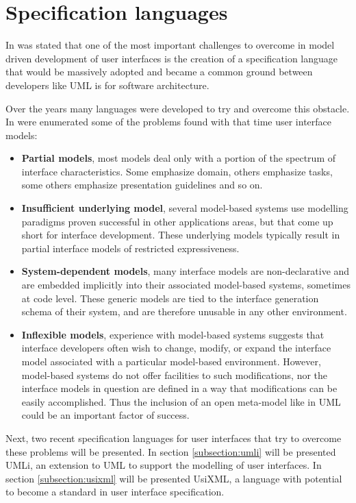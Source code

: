 \section{Specification languages}
\label{section:specification_languages}

In \cite{idealxml2} was stated that one of the most important challenges to overcome in model driven development of user interfaces is the creation of a specification language that would be massively adopted and became a common ground between developers like UML is for software architecture.

Over the years many languages were developed to try and overcome this obstacle. In \cite{mecano} were enumerated some of the problems found with that time user interface models:
\begin{itemize}
\item \textbf{Partial models}, most models deal only with a portion of the spectrum of interface characteristics. Some emphasize domain, others emphasize tasks, some others emphasize presentation guidelines and so on.

\item \textbf{Insufficient underlying model}, several model-based systems use modelling paradigms proven successful in other applications areas, but that come up short for interface development. These underlying models typically result in partial interface models of restricted expressiveness.

\item \textbf{System-dependent models}, many interface models are non-declarative and are embedded implicitly into their associated model-based systems, sometimes at code level. These generic models are tied to the interface generation schema of their system, and are therefore unusable in any other environment.

\item \textbf{Inflexible models}, experience with model-based systems suggests that interface developers often wish to change, modify, or expand the interface model associated with a particular model-based environment. However, model-based systems do not offer facilities to such modifications, nor the interface models in question are defined in a way that modifications can be easily accomplished. Thus the inclusion of an open meta-model like in UML could be an important factor of success.
\end{itemize}

Next, two recent specification languages for user interfaces that try to overcome these problems will be presented. In section \ref{subsection:umli} will be presented UMLi, an extension to UML to support the modelling of user interfaces. In section \ref{subsection:usixml} will be presented UsiXML, a language with potential to become a standard in user interface specification.


